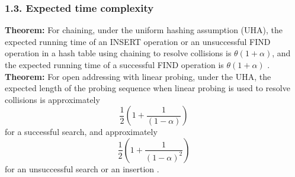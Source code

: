 \documentclass[12pt, a4paper]{article}
\begin{document}
\subsubsection*{1.3. Expected time complexity}
\textbf{Theorem:} For chaining, under the uniform hashing assumption (UHA), the expected running time of an INSERT operation or an unsuccessful FIND operation in a hash
table using chaining to resolve collisions is $\theta(1 + \alpha)$, and the expected running time of a successful FIND operation is $\theta(1 + \alpha)$ \cite{clrs}.\\
\textbf{Theorem:} For open addressing with linear probing, under the UHA, the expected length of the probing sequence when linear probing is used to resolve collisions is
approximately
$$\frac{1}{2} \left( 1 + \frac{1}{(1-\alpha)} \right)$$
for a successful search, and approximately
$$\frac{1}{2} \left( 1 + \frac{1}{(1-\alpha)^2} \right)$$
for an unsuccessful search or an insertion \cite{knuth}.\\
\end{document}

